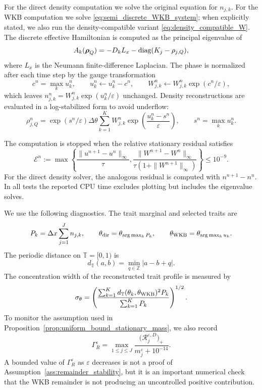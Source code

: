 \documentclass[11pt]{article}
\begin{document}
For the direct density computation we solve the original equation for
\(n_{j,k}\). For the WKB computation we solve
\eqref{eq:semi_discrete_WKB_system}; when explicitly stated, we also run the
density-compatible variant \eqref{eq:density_compatible_W}. The discrete
effective Hamiltonian is computed as the principal eigenvalue of
\[
    A_k(\boldsymbol\rho_Q)
    =
    -D_kL_x-	\textnormal{diag}(K_j-\rho_{j,Q}),
\]
where \(L_x\) is the Neumann finite-difference Laplacian. The phase is
normalized after each time step by the gauge transformation
\[
    c^n=\max_k u_k^n,
    \qquad
    u_k^n\leftarrow u_k^n-c^n,
    \qquad
    W_{j,k}^n\leftarrow W_{j,k}^n\exp(c^n/\varepsilon),
\]
which leaves \(n_{j,k}^n=W_{j,k}^n\exp(u_k^n/\varepsilon)\) unchanged.
Density reconstructions are evaluated in a log-stabilized form to avoid
underflow:
\[
    \rho_{j,Q}^n
    =
    \exp(s^n/\varepsilon)
    \Delta\theta\sum_{k=1}^K
    W_{j,k}^n
    \exp\left(\frac{u_k^n-s^n}{\varepsilon}\right),
    \qquad
    s^n=\max_k u_k^n .
\]

The computation is stopped when the relative stationary residual satisfies
\begin{equation}\label{eq:stationary_stopping}
    \mathcal E^n
    :=
    \max\left\{
    \frac{\|u^{n+1}-u^n\|_\infty}{\tau},
    \frac{\|W^{n+1}-W^n\|_\infty}
         {\tau(1+\|W^{n+1}\|_\infty)}
    \right\}
    \le 10^{-9} .
\end{equation}
For the direct density solver, the analogous residual is computed with
\(n^{n+1}-n^n\). In all tests the reported CPU time excludes plotting but
includes the eigenvalue solves.

We use the following diagnostics. The trait marginal and selected traits are
\[
    P_k=\Delta x\sum_{j=1}^J n_{j,k},
    \qquad
    \theta_{\rm dir}=\theta_{\arg\max_k P_k},
    \qquad
    \theta_{\rm WKB}=\theta_{\arg\max_k u_k} .
\]
The periodic distance on \(\mathbb T=[0,1)\) is
\[
    d_{\mathbb T}(a,b)
    =
    \min_{q\in\mathbb Z}|a-b+q| .
\]
The concentration width of the reconstructed trait profile is measured by
\[
    \sigma_\theta
    =
    \left(
    \frac{\sum_{k=1}^K d_{\mathbb T}(\theta_k,\theta_{\rm WKB})^2P_k}
         {\sum_{k=1}^K P_k}
    \right)^{1/2} .
\]
To monitor the assumption used in
Proposition~\ref{prop:uniform_bound_stationary_mass}, we also record
\begin{equation}\label{eq:remainder_diagnostic}
    \Gamma_R^\varepsilon
    =
    \max_{1\le j\le J}
    \frac{\bigl(\mathcal R_j^{\varepsilon,D}\bigr)_+}
         {m_j^\varepsilon+10^{-14}} .
\end{equation}
A bounded value of \(\Gamma_R^\varepsilon\) as \(\varepsilon\) decreases is not
a proof of Assumption~\ref{ass:remainder_stability}, but it is an important
numerical check that the WKB remainder is not producing an uncontrolled
positive contribution.
\end{document}
